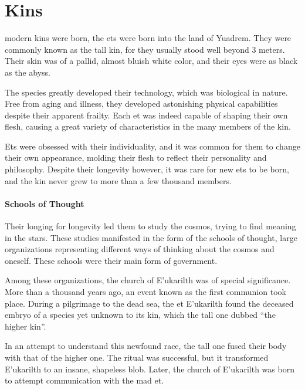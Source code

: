\chapter{Kins} \label{ch::kins}

modern kins were born, the ets were born into the land of Yuadrem.
They were commonly known as the tall kin, for they usually stood well beyond 3 meters.
Their skin was of a pallid, almost bluish white color, and their eyes were as black as the abyss.

The species greatly developed their technology, which was biological in nature.
Free from aging and illness, they developed astonishing physical capabilities despite their apparent frailty.
Each et was indeed capable of shaping their own flesh, causing a great variety of characteristics in the many members of the kin.

Ets were obsessed with their individuality, and it was common for them to change their own appearance, molding their flesh to reflect their personality and philosophy.
Despite their longevity however, it was rare for new ets to be born, and the kin never grew to more than a few thousand members.

\subsubsection{Schools of Thought}
Their longing for longevity led them to study the cosmos, trying to find meaning in the stars.
These studies manifested in the form of the schools of thought, large organizations representing different ways of thinking about the cosmos and oneself.
These schools were their main form of government.%

Among these organizations, the church of E'ukarilth was of special significance.
More than a thousand years ago, an event known as the first communion took place.
During a pilgrimage to the dead sea, the et E'ukarilth found the deceased embryo of a species yet unknown to its kin, which the tall one dubbed ``the higher kin''.

In an attempt to understand this newfound race, the tall one fused their body with that of the higher one.
The ritual was successful, but it transformed E'ukarilth to an insane, shapeless blob.
Later, the church of E'ukarilth was born to attempt communication with the mad et.

